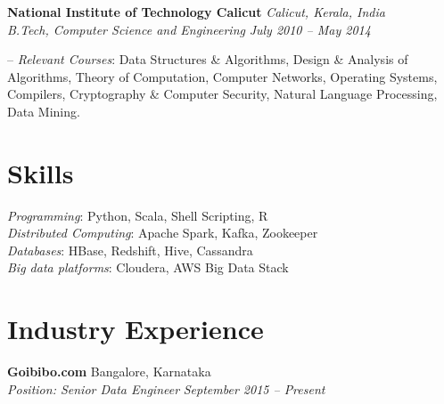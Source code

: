 \documentclass[margin,line]{resume}
\begin{document}
\begin{resume}
    \textbf{National Institute of Technology Calicut} \hfill \textit{Calicut, Kerala, India} \vspace{1mm}\\\vspace{1mm}%
    \textsl{B.Tech, Computer Science and Engineering} \hfill \textit{ July 2010 -- May 2014}\vspace{-3mm}\\\vspace{-1mm}%
    \begin{list2}
        \item[--] \textit{Relevant Courses}: Data Structures \& Algorithms, Design \& Analysis of Algorithms, Theory
of Computation, Computer Networks, Operating Systems, 
Compilers, Cryptography \& Computer Security, Natural Language Processing, Data Mining.
    \end{list2}\vspace{-1.5mm}
    
 \vspace{3mm}

   \section{\mysidestyle Skills} 

 \textit{Programming}: Python, Scala, Shell Scripting, R\\
 \textit{Distributed Computing}: Apache Spark, Kafka, Zookeeper \\
\textit{Databases}: HBase, Redshift, Hive, Cassandra \\
\textit{Big data platforms}: Cloudera, AWS Big Data Stack \\ 



    \section{\mysidestyle Industry Experience}
    \textbf{Goibibo.com } 				\hfill  Bangalore, Karnataka \\
      \textit{Position: Senior Data Engineer } 			\hfill \textit{September 2015 -- Present}
  


\end{resume}
\end{document}
